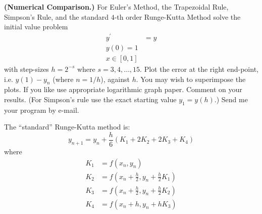 \textbf{(Numerical Comparison.)} For Euler's Method, the Trapezoidal
Rule, Simpson's Rule, and the standard $4$-th order Runge-Kutta
Method solve the initial value problem
\begin{align}
y^\prime &= y \\
y(0) = 1\\
x \in [0,1]
\end{align}
with step-sizes $h = 2^{-s}$ where $s = 3,4,\dots,15$. Plot the error
at the right end-point, i.e. $y(1) - y_n$ (where $n = 1/h$), against
$h$. You may wish to superimpose the plots. If you like use
appropriate logarithmic graph paper. Comment on your results. (For
Simpson's rule use the exact starting value $y_1 = y(h)$.) Send me
your program by e-mail.

The ``standard'' Runge-Kutta method is:
\[
y_{n+1} = y_n + \frac{h}{6} (K_1 + 2K_2 + 2K_3 + K_4)
\]
where
\begin{align*}
K_1 &= f(x_n, y_n) \\
K_2 &= f \left(x_n + \frac{h}{2}, y_n + \frac{h}{2} K_1 \right) \\
K_3 &= f \left(x_n + \frac{h}{2}, y_n + \frac{h}{2} K_2 \right) \\
K_4 &= f \left(x_n + h, y_n + h K_3 \right) \\
\end{align*}

